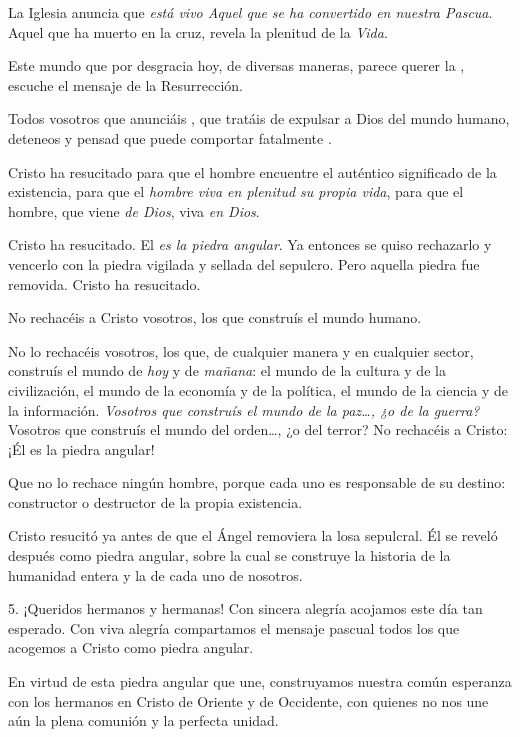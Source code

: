 \begin{body}
La Iglesia anuncia que \textit{está vivo Aquel que se ha convertido en nuestra Pascua}. Aquel que ha muerto en la cruz, revela la plenitud de la \textit{Vida}.

Este mundo que por desgracia hoy, de diversas maneras, parece querer la , escuche el mensaje de la Resurrección.

Todos vosotros que anunciáis , que tratáis de expulsar a Dios del mundo humano, deteneos y pensad que  puede comportar fatalmente .

Cristo ha resucitado para que el hombre encuentre el auténtico significado de la existencia, para que el \textit{hombre viva en plenitud su propia vida}, para que el hombre, que viene \textit{de Dios}, viva \textit{en Dios}.

Cristo ha resucitado. El \textit{es la piedra angular}. Ya entonces se quiso rechazarlo y vencerlo con la piedra vigilada y sellada del sepulcro. Pero aquella piedra fue removida. Cristo ha resucitado.

No rechacéis a Cristo vosotros, los que construís el mundo humano.

No lo rechacéis vosotros, los que, de cualquier manera y en cualquier sector, construís el mundo de \textit{hoy} y de \textit{mañana}: el mundo de la cultura y de la civilización, el mundo de la economía y de la política, el mundo de la ciencia y de la información. \textit{Vosotros que construís el mundo de la paz\ldots, ¿o de la guerra?} Vosotros que construís el mundo del orden\ldots, ¿o del terror? No rechacéis a Cristo: ¡Él es la piedra angular!

Que no lo rechace ningún hombre, porque cada uno es responsable de su destino: constructor o destructor de la propia existencia.

Cristo resucitó ya antes de que el Ángel removiera la losa sepulcral. Él se reveló después como piedra angular, sobre la cual se construye la historia de la humanidad entera y la de cada uno de nosotros.

5. ¡Queridos hermanos y hermanas! Con sincera alegría acojamos este día tan esperado. Con viva alegría compartamos el mensaje pascual todos los que acogemos a Cristo como piedra angular.

En virtud de esta piedra angular que une, construyamos nuestra común esperanza con los hermanos en Cristo de Oriente y de Occidente, con quienes no nos une aún la plena comunión y la perfecta unidad.


\end{body}
